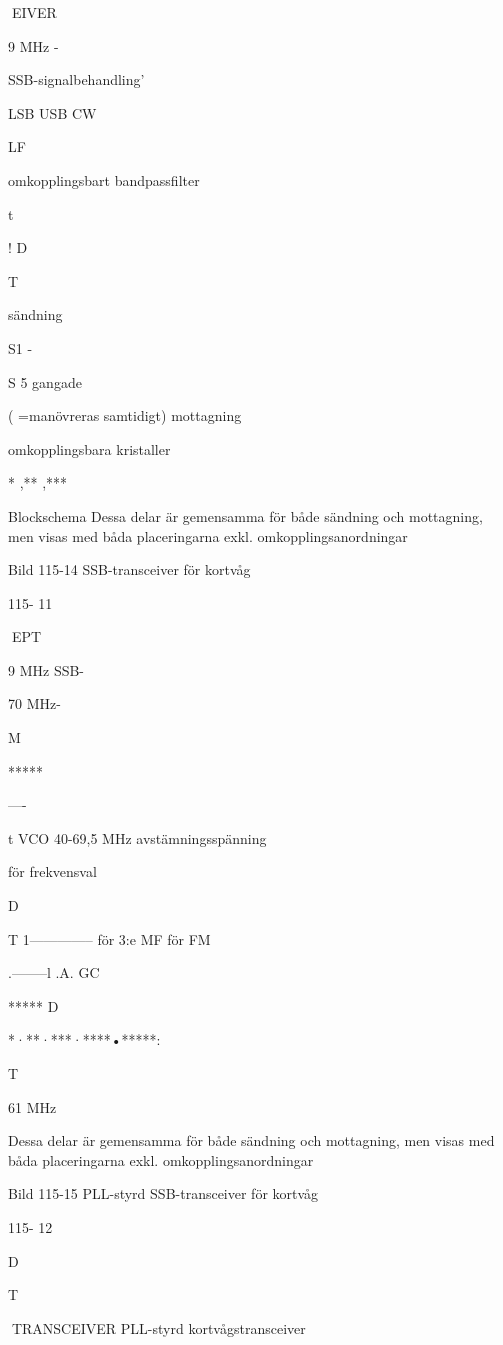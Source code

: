 \documentclass[a4paper,twoside,twocolumn,openright]{book}
\begin{document}
{{{EIVER

9 MHz -

SSB-signalbehandling'

LSB USB CW

LF

omkopplingsbart
bandpassfilter

t

!
D

T

sändning

S1 -

S 5 gangade

( =manövreras samtidigt)
mottagning

omkopplingsbara
kristaller

* ,** ,***

Blockschema
Dessa delar är gemensamma för både sändning och mottagning, men visas med
båda placeringarna exkl. omkopplingsanordningar

Bild 115-14 SSB-transceiver för kortvåg

115- 11

EPT

9 MHz
SSB-

70 MHz-

M

*****

----

t
VCO 40-69,5 MHz
avstämningsspänning

för frekvensval

D

T
1-------------- för 3:e MF för FM

.--------l .A. GC

*****
D

*·**·***·****•*****:

T

61 MHz

Dessa delar är gemensamma för både sändning och mottagning, men visas med
båda placeringarna exkl. omkopplingsanordningar

Bild 115-15 PLL-styrd SSB-transceiver för kortvåg

115- 12

D

T

TRANSCEIVER
PLL-styrd kortvågstransceiver

}}}
\end{document}
